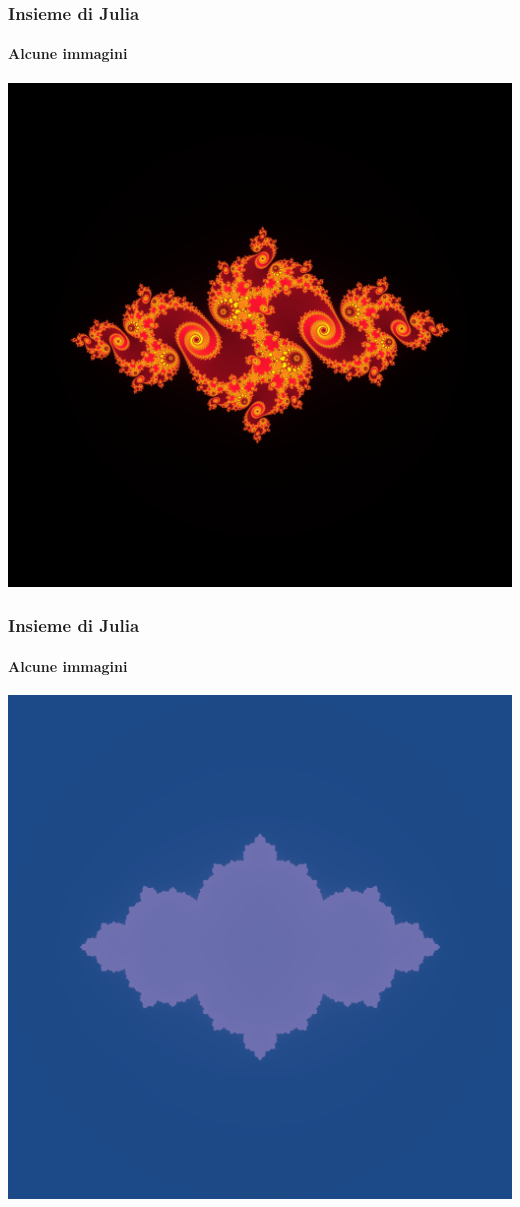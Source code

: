 \documentclass{beamer}
\begin{document}
			\begin{frame}
				\frametitle{Insieme di Julia}
				\framesubtitle{Alcune immagini}
				\begin{center}
					\includegraphics[width=0.7\linewidth]{"../Insieme di Julia/cosa63"}
				\end{center}
			\end{frame}
			\begin{frame}
				\frametitle{Insieme di Julia}
				\framesubtitle{Alcune immagini}
				\begin{center}
					\includegraphics[width=0.7\linewidth]{"../Insieme di Julia/julia1"}
				\end{center}
			\end{frame}
\end{document}
